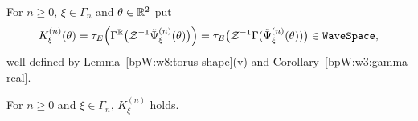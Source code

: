 \begin{definition}\label{bpW:w8:Kshell}
For $n\ge0$, $\xi\in\Gamma_n$ and $\theta\in\mathbb{R}^2$ put
\[K^{(n)}_\xi(\theta)=\tau_E\Bigl(\Gamma^{\mathbb{R}}\bigl(\mathcal Z^{-1}\tilde\Psi^{(n)}_\xi(\theta)\bigr)\Bigr)
=\tau_E\bigl(\mathcal Z^{-1}\Gamma(\tilde\Psi^{(n)}_\xi(\theta))\bigr)\in\texttt{WaveSpace},\]
well defined by Lemma~\ref{bpW:w8:torus-shape}(v) and Corollary~\ref{bpW:w3:gamma-real}.
\end{definition}

\begin{lemma}\label{bpW:w8:shell-embedding}
For $n\ge0$ and $\xi\in\Gamma_n$,  $K^{(n)}_\xi$ holds.
\end{lemma}
